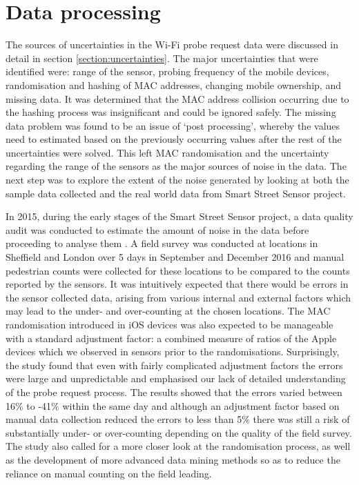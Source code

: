 \section{Data processing} \label{section:processing}

The sources of uncertainties in the Wi-Fi probe request data were discussed in detail in section \ref{section:uncertainties}.
The major uncertainties that were identified were: range of the sensor, probing frequency of the mobile devices, randomisation and hashing of MAC addresses, changing mobile ownership, and missing data.
It was determined that the MAC address collision occurring due to the hashing process was insignificant and could be ignored safely.
The missing data problem was found to be an issue of `post processing', whereby the values need to estimated based on the previously occurring values after the rest of the uncertainties were solved.
This left MAC randomisation and the uncertainty regarding the range of the sensors as the major sources of noise in the data.
The next step was to explore the extent of the noise generated by looking at both the sample data collected and the real world data from Smart Street Sensor project.

%
In 2015, during the early stages of the Smart Street Sensor project, a data quality audit was conducted to estimate the amount of noise in the data before proceeding to analyse them \cite{lugomer2017}.
A field survey was conducted at locations in Sheffield and London over 5 days in September and December 2016 and manual pedestrian counts were collected for these locations to be compared to the counts reported by the sensors.
It was intuitively expected that there would be errors in the sensor collected data, arising from various internal and external factors which may lead to the under- and over-counting at the chosen locations.
The MAC randomisation introduced in iOS devices was also expected to be manageable with a standard adjustment factor: a combined measure of ratios of the Apple devices which we observed in sensors prior to the randomisations.
Surprisingly, the study found that even with fairly complicated adjustment factors the errors were large and unpredictable and emphasised our lack of detailed understanding of the probe request process.
The results showed that the errors varied between 16\% to -41\% within the same day and although an adjustment factor based on manual data collection reduced the errors to less than 5\% there was still a risk of substantially under- or over-counting depending on the quality of the field survey.
The study also called for a more closer look at the randomisation process, as well as the development of more advanced data mining methods so as to reduce the reliance on manual counting on the field leading. 

